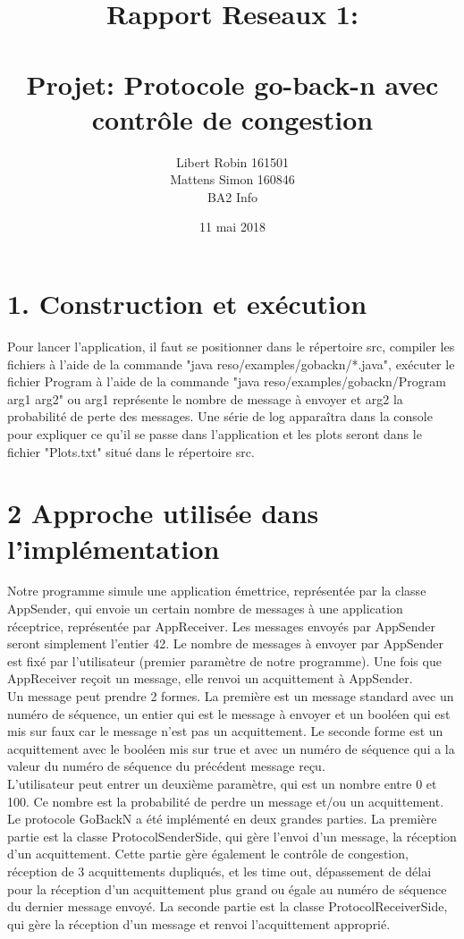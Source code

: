 \documentclass{report}
\title{Rapport Reseaux 1: \\ \\ Projet: Protocole go-back-n avec contrôle de congestion}
\author{Libert Robin 161501\\ Mattens Simon 160846 \\ BA2 Info}
\date{11 mai 2018}
\begin{document}
\maketitle
\section*{1. Construction et exécution}
\hspace*{0,5cm} Pour lancer l'application, il faut se positionner dans le répertoire src, compiler les fichiers à l'aide de la commande "java reso/examples/gobackn/*.java", exécuter le fichier Program à l'aide de la commande "java reso/examples/gobackn/Program arg1 arg2" ou arg1 représente le nombre de message à envoyer et arg2 la probabilité de perte des messages. Une série de log apparaîtra dans la console pour expliquer ce qu'il se passe dans l'application et les plots seront dans le fichier "Plots.txt" situé dans le répertoire src.

\section*{2 Approche utilisée dans l'implémentation}

Notre programme simule une application émettrice, représentée par la classe AppSender, qui envoie un certain nombre de messages à une application réceptrice, représentée par AppReceiver.
Les messages envoyés par AppSender seront simplement l'entier 42. Le nombre de messages à envoyer par AppSender est fixé par l'utilisateur (premier paramètre de notre programme). Une fois que 
AppReceiver reçoit un message, elle renvoi un acquittement à AppSender.\\

Un message peut prendre 2 formes. La première est un message standard avec un numéro de séquence, un entier qui est le message à envoyer et un booléen qui est mis sur faux car le message n'est pas un acquittement. Le seconde forme est un acquittement avec le booléen mis sur true et avec un numéro de séquence qui a la valeur du numéro de séquence du précédent message reçu.\\

L'utilisateur peut entrer un deuxième paramètre, qui est un nombre entre 0 et 100. Ce nombre est la probabilité de perdre un message et/ou un acquittement.\\

Le protocole GoBackN a été implémenté en deux grandes parties. La première partie est la classe ProtocolSenderSide, qui gère l'envoi d'un message, la réception d'un acquittement. 
Cette partie gère également le contrôle de congestion, réception de 3 acquittements dupliqués, et les time out, dépassement de délai pour la réception d'un acquittement plus grand ou égale 
au numéro de séquence du dernier message envoyé. La seconde partie est la classe ProtocolReceiverSide, qui gère la réception d'un message et renvoi l'acquittement approprié.\\
\end{document}
